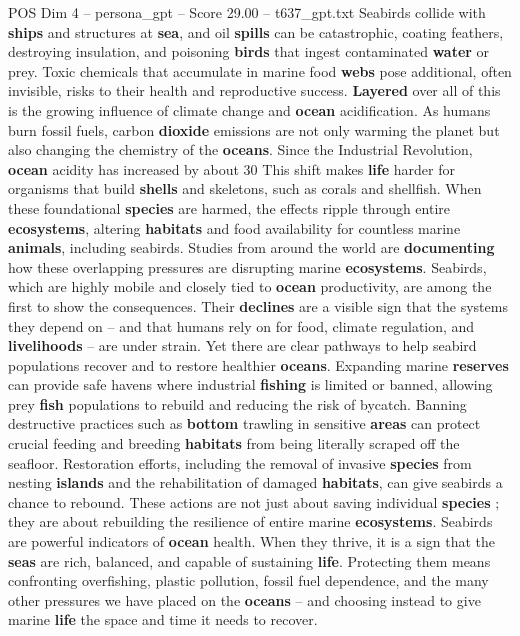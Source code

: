 \begin{textsample}{POS Dim 4 – persona\_gpt – Score 29.00 – t637\_gpt.txt}
Seabirds collide with \textbf{ships} and structures at \textbf{sea}, and oil \textbf{spills} can be catastrophic, coating feathers, destroying insulation, and poisoning \textbf{birds} that ingest contaminated \textbf{water} or prey.
Toxic chemicals that accumulate in marine food \textbf{webs} pose additional, often invisible, risks to their health and reproductive success. \textbf{Layered} over all of this is the growing influence of climate change and \textbf{ocean} acidification.
As humans burn fossil fuels, carbon \textbf{dioxide} emissions are not only warming the planet but also changing the chemistry of the \textbf{oceans}.
Since the Industrial Revolution, \textbf{ocean} acidity has increased by about 30 %
This shift makes \textbf{life} harder for organisms that build \textbf{shells} and skeletons, such as corals and shellfish.
When these foundational \textbf{species} are harmed, the effects ripple through entire \textbf{ecosystems}, altering \textbf{habitats} and food availability for countless marine \textbf{animals}, including seabirds.
Studies from around the world are \textbf{documenting} how these overlapping pressures are disrupting marine \textbf{ecosystems}.
Seabirds, which are highly mobile and closely tied to \textbf{ocean} productivity, are among the first to show the consequences.
Their \textbf{declines} are a visible sign that the systems they depend on – and that humans rely on for food, climate regulation, and \textbf{livelihoods} – are under strain.
Yet there are clear pathways to help seabird populations recover and to restore healthier \textbf{oceans}.
Expanding marine \textbf{reserves} can provide safe havens where industrial \textbf{fishing} is limited or banned, allowing prey \textbf{fish} populations to rebuild and reducing the risk of bycatch.
Banning destructive practices such as \textbf{bottom} trawling in sensitive \textbf{areas} can protect crucial feeding and breeding \textbf{habitats} from being literally scraped off the seafloor.
Restoration efforts, including the removal of invasive \textbf{species} from nesting \textbf{islands} and the rehabilitation of damaged \textbf{habitats}, can give seabirds a chance to rebound.
These actions are not just about saving individual \textbf{species} ; they are about rebuilding the resilience of entire marine \textbf{ecosystems}.
Seabirds are powerful indicators of \textbf{ocean} health.
When they thrive, it is a sign that the \textbf{seas} are rich, balanced, and capable of sustaining \textbf{life}.
Protecting them means confronting overfishing, plastic pollution, fossil fuel dependence, and the many other pressures we have placed on the \textbf{oceans} – and choosing instead to give marine \textbf{life} the space and time it needs to recover.

\end{textsample}
